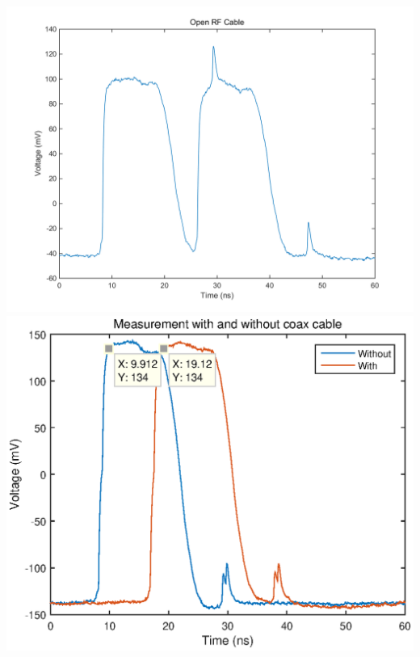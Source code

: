 \includegraphics[width=\textwidth]{plots/open_rf_cable}
\includegraphics[width=\textwidth]{plots/part_2}